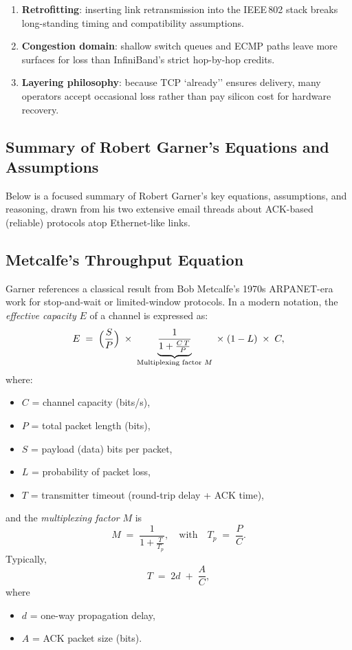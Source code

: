 \begin{enumerate}
\item \textbf{Retrofitting}: inserting link retransmission into the IEEE\,802
      stack breaks long-standing timing and compatibility assumptions.
\item \textbf{Congestion domain}: shallow switch queues and ECMP paths leave
      more surfaces for loss than InfiniBand’s strict hop-by-hop credits.
\item \textbf{Layering philosophy}: because TCP `already'' ensures delivery,
      many operators accept occasional loss rather than pay silicon cost for
      hardware recovery.
\end{enumerate}

\subsection{Summary of Robert Garner’s Equations and Assumptions}

Below is a focused summary of Robert Garner’s key equations, assumptions, and reasoning, drawn from his two extensive email threads about ACK-based (reliable) protocols atop Ethernet-like links.

\subsection{Metcalfe’s Throughput Equation}

Garner references a classical result from Bob Metcalfe’s 1970s ARPANET-era work for stop-and-wait or limited-window protocols. In a modern notation, the \emph{effective capacity} $E$ of a channel is expressed as:
\[
  E \;=\; 
  \Bigl(\frac{S}{P}\Bigr)\;
  \times\;\underbrace{\frac{1}{1 + \frac{C\,T}{P}}}_{\text{Multiplexing factor } M}
  \;\times\;(1 - L)\;\times\;C,
\]
where:
\begin{itemize}
\item $C$ = channel capacity (bits/s),
\item $P$ = total packet length (bits),
\item $S$ = payload (data) bits per packet,
\item $L$ = probability of packet loss,
\item $T$ = transmitter timeout (round-trip delay + ACK time),
\end{itemize}
and the \emph{multiplexing factor} $M$ is
\[
  M \;=\;
  \frac{1}{1 + \frac{T}{T_p}}, 
  \quad \text{with} \quad 
  T_p \;=\;\frac{P}{C}.
\]
Typically, 
\[
T \;=\; 2d \;+\; \frac{A}{C},
\]
where 
\begin{itemize}
\item $d$ = one-way propagation delay,
\item $A$ = ACK packet size (bits).
\end{itemize}

